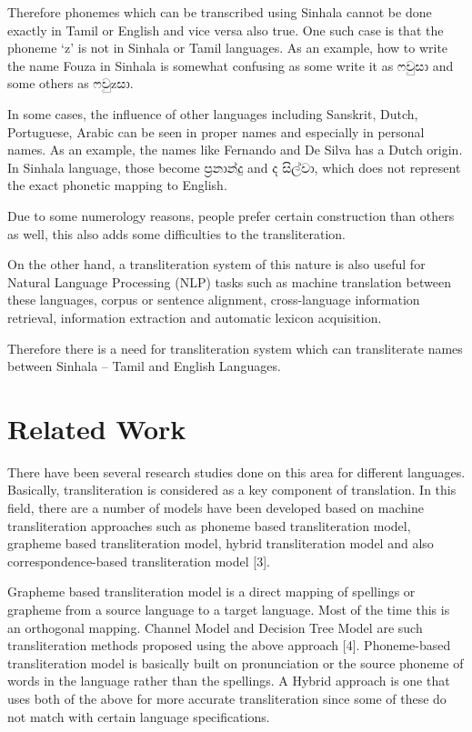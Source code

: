 \documentclass[10pt, a4paper, conference, compsocconf]{IEEEtran}
\begin{document}
Therefore phonemes which can be transcribed using Sinhala cannot be done exactly in Tamil or English and vice versa also true. One such case is that the phoneme ‘z’ is not in Sinhala or Tamil languages. As an example, how to write the name Fouza in Sinhala is somewhat confusing as some write it as  {\sifont ෆවුසා}  and some others as {\sifont ෆවු}z{\sifont සා}.

In some cases, the influence of other languages including Sanskrit, Dutch, Portuguese, Arabic can be seen in proper names and especially in personal names. As an example, the names like Fernando and De Silva has a Dutch origin. In Sinhala language, those become {\sifont ප්‍රනාන්දු} and {\sifont ද සිල්වා}, which does not represent the exact phonetic mapping to English.

Due to some numerology reasons, people prefer certain construction than others as well, this also adds some difficulties to the transliteration. 

On the other hand, a transliteration system of this nature is also useful for Natural Language Processing (NLP) tasks such as machine translation between these languages, corpus or sentence alignment, cross-language information retrieval, information extraction and automatic lexicon acquisition.

Therefore there is a need for transliteration system which can transliterate names between Sinhala – Tamil and English Languages.

\section{Related Work}
There have been several research studies done on this area for different languages. Basically, transliteration is considered as a key component of translation. In this field, there are a number of models have been developed based on machine transliteration approaches such as phoneme based transliteration model, grapheme based transliteration model, hybrid transliteration model and also correspondence-based transliteration model [3].

Grapheme based transliteration model is a direct mapping of spellings or grapheme from a source language to a target language. Most of the time this is an orthogonal mapping. Channel Model and Decision Tree Model are such transliteration methods proposed using the above approach [4]. Phoneme-based transliteration model is basically built on pronunciation or the source phoneme of words in the language rather than the spellings. A Hybrid approach is one that uses both of the above for more accurate transliteration since some of these do not match with certain language specifications.
\end{document}
